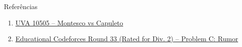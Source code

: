 \begin{frame}[fragile]{Referências}

    \begin{enumerate}
        \item \href{https://uva.onlinejudge.org/index.php?option=com_onlinejudge&Itemid=8&page=show_problem&category=0&problem=1446&mosmsg=Submission+received+with+ID+23466721}{UVA 10505 -- Montesco vs Capuleto}

        \item \href{https://codeforces.com/problemset/problem/893/C}{Educational Codeforces Round 33 (Rated for Div. 2) -- Problem C: Rumor}
    \end{enumerate}

\end{frame}
